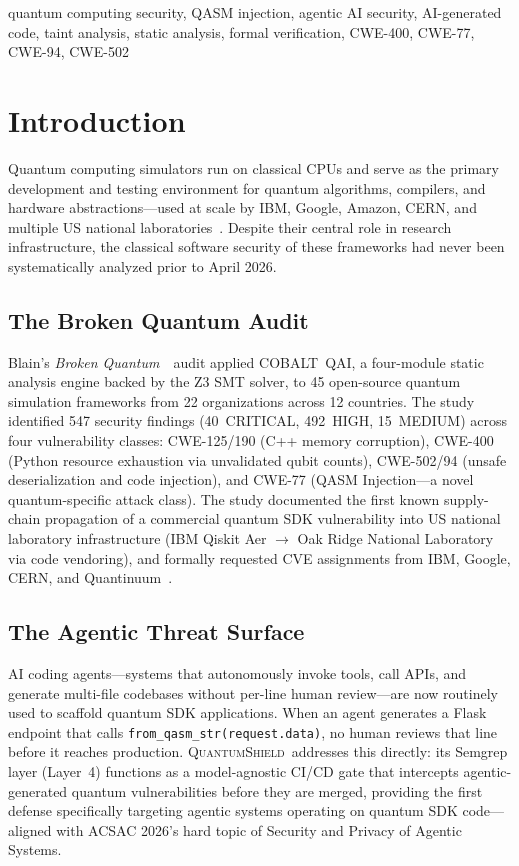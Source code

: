 \documentclass[conference,compsoc]{IEEEtran}
\newcommand{\tool}{\textsc{QuantumShield}}
\newcommand{\broken}{\textit{Broken Quantum}~\cite{blain2026broken}}
\begin{document}
\begin{IEEEkeywords}
quantum computing security, QASM injection, agentic AI security,
AI-generated code, taint analysis, static analysis, formal verification,
CWE-400, CWE-77, CWE-94, CWE-502
\end{IEEEkeywords}

\section{Introduction}
\label{sec:intro}
\noindent Quantum computing simulators run on classical CPUs and serve as the
primary development and testing environment for quantum algorithms,
compilers, and hardware abstractions---used at scale by IBM, Google,
Amazon, CERN, and multiple US national
laboratories~\cite{blain2026broken}.
Despite their central role in research infrastructure, the classical
software security of these frameworks had never been systematically
analyzed prior to April 2026.

\subsection{The Broken Quantum Audit}
\noindent Blain's \broken\ audit applied COBALT~QAI, a four-module static analysis
engine backed by the Z3 SMT solver, to 45 open-source quantum simulation
frameworks from 22 organizations across 12 countries.
The study identified 547 security findings (40~CRITICAL, 492~HIGH,
15~MEDIUM) across four vulnerability classes:
CWE-125/190 (C++ memory corruption),
CWE-400 (Python resource exhaustion via unvalidated qubit counts),
CWE-502/94 (unsafe deserialization and code injection), and
CWE-77 (QASM Injection---a novel quantum-specific attack class).
The study documented the first known supply-chain propagation of a
commercial quantum SDK vulnerability into US national laboratory
infrastructure (IBM Qiskit Aer $\to$ Oak Ridge National Laboratory
via code vendoring), and formally requested CVE assignments from IBM,
Google, CERN, and Quantinuum~\cite{blain2026broken}.

\subsection{The Agentic Threat Surface}
\noindent AI coding agents---systems that autonomously invoke tools, call APIs,
and generate multi-file codebases without per-line human review---are now
routinely used to scaffold quantum SDK applications.
When an agent generates a Flask endpoint that calls
\texttt{from\_qasm\_str(request.data)}, no human reviews that line before
it reaches production.
\tool\ addresses this directly: its Semgrep layer (Layer~4) functions as
a model-agnostic CI/CD gate that intercepts agentic-generated quantum
vulnerabilities before they are merged, providing the first defense
specifically targeting agentic systems operating on quantum SDK code---
aligned with ACSAC 2026's hard topic of Security and Privacy of Agentic
Systems.
\end{document}
